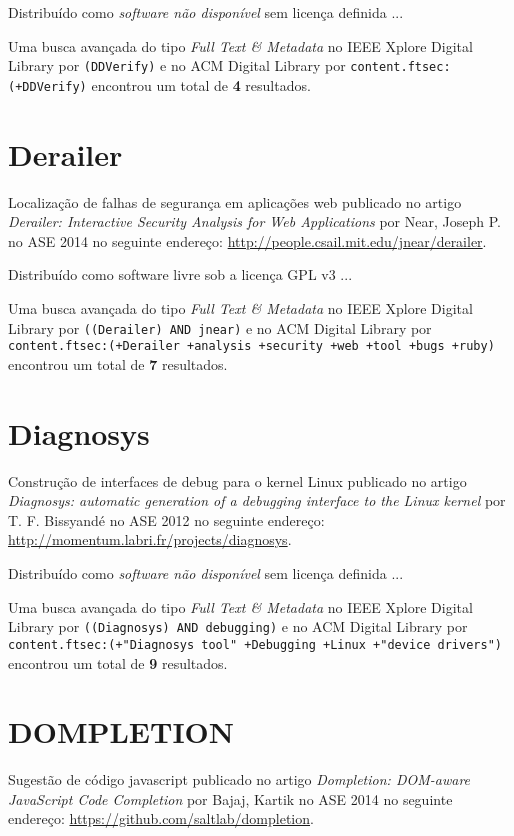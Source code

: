 Distribuído como {\it software não disponível}
sem licença definida ...


Uma busca avançada do tipo {\it Full Text \& Metadata} no IEEE Xplore Digital Library por
\texttt{(DDVerify)}
e no ACM Digital Library por
\texttt{content.ftsec:(+DDVerify)}
encontrou um total de
{\bf 4}
resultados.

\section{Derailer}

Localização de falhas de segurança em aplicações web
publicado no artigo
{\it Derailer: Interactive Security Analysis for Web Applications}
por
Near, Joseph P.
no
ASE
2014
no seguinte endereço:
\url{http://people.csail.mit.edu/jnear/derailer}.

Distribuído como software livre
sob a licença GPL v3 ...


Uma busca avançada do tipo {\it Full Text \& Metadata} no IEEE Xplore Digital Library por
\texttt{((Derailer) AND jnear)}
e no ACM Digital Library por
\texttt{content.ftsec:(+Derailer +analysis +security +web +tool +bugs +ruby)}
encontrou um total de
{\bf 7}
resultados.

\section{Diagnosys}

Construção de interfaces de debug para o kernel Linux
publicado no artigo
{\it Diagnosys: automatic generation of a debugging interface to the Linux kernel}
por
T. F. Bissyandé
no
ASE
2012
no seguinte endereço:
\url{http://momentum.labri.fr/projects/diagnosys}.

Distribuído como {\it software não disponível}
sem licença definida ...


Uma busca avançada do tipo {\it Full Text \& Metadata} no IEEE Xplore Digital Library por
\texttt{((Diagnosys) AND debugging)}
e no ACM Digital Library por
\texttt{content.ftsec:(+"Diagnosys tool" +Debugging +Linux +"device drivers")}
encontrou um total de
{\bf 9}
resultados.

\section{DOMPLETION}

Sugestão de código javascript
publicado no artigo
{\it Dompletion: DOM-aware JavaScript Code Completion}
por
Bajaj, Kartik
no
ASE
2014
no seguinte endereço:
\url{https://github.com/saltlab/dompletion}.

